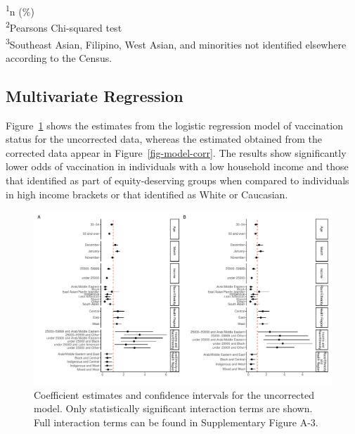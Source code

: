 \documentclass[
  letterpaper,
  DIV=11,
  numbers=noendperiod]{scrartcl}
\begin{document}
\begin{minipage}{\linewidth}
\textsuperscript{1}n (\%)\\
\textsuperscript{2}Pearson\textquotesingle{}s Chi-squared test\\
\textsuperscript{3}Southeast Asian, Filipino, West Asian,
and minorities not identified elsewhere according to the Census.\\
\end{minipage}

\hypertarget{multivariate-regression}{%
\subsection{Multivariate Regression}\label{multivariate-regression}}

Figure~\ref{fig-model-uncorr} shows the estimates from the logistic
regression model of vaccination status for the uncorrected data, whereas
the estimated obtained from the corrected data appear in
Figure~\ref{fig-model-corr}. The results show significantly lower odds
of vaccination in individuals with a low household income and those that
identified as part of equity-deserving groups when compared to
individuals in high income brackets or that identified as White or
Caucasian.

\begin{figure}

\includegraphics{main_files/figure-pdf/fig-model-uncorr-1.pdf} \hfill{}

\caption{\label{fig-model-uncorr}Coefficient estimates and confidence
intervals for the uncorrected model. Only statistically significant
interaction terms are shown. Full interaction terms can be found in
Supplementary Figure A-3.}

\end{figure}
\end{document}
